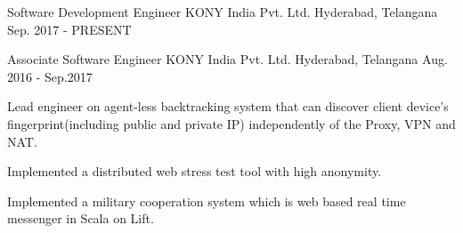 

\begin{cventries}

  \cventry
    {Software Development Engineer} %
    {KONY India Pvt. Ltd.} %
    {Hyderabad, Telangana} %
    {Sep. 2017 - PRESENT} %
    {
    }

  \cventry
    {Associate Software Engineer} %
    {KONY India Pvt. Ltd.} %
    {Hyderabad, Telangana} %
    {Aug. 2016 - Sep.2017} %
    {
      \begin{cvitems} %
        \item {Lead engineer on agent-less backtracking system that can discover client device's fingerprint(including public and private IP) independently of the Proxy, VPN and NAT.}
        \item {Implemented a distributed web stress test tool with high anonymity.}
        \item {Implemented a military cooperation system which is web based real time messenger in Scala on Lift.}
      \end{cvitems}
    }

\end{cventries}
